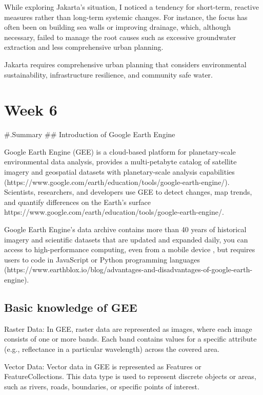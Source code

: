 \documentclass[
  letterpaper,
  DIV=11,
  numbers=noendperiod]{scrreprt}
\begin{document}
While exploring Jakarta's situation, I noticed a tendency for
short-term, reactive measures rather than long-term systemic changes.
For instance, the focus has often been on building sea walls or
improving drainage, which, although necessary, failed to manage the root
causes such as excessive groundwater extraction and less comprehensive
urban planning.

Jakarta requires comprehensive urban planning that considers
environmental sustainability, infrastructure resilience, and community
safe water.


\chapter{Week 6}\label{week-6}

\#.Summary \#\# Introduction of Google Earth Engine

Google Earth Engine (GEE) is a cloud-based platform for planetary-scale
environmental data analysis, provides a multi-petabyte catalog of
satellite imagery and geospatial datasets with planetary-scale analysis
capabilities
(https://www.google.com/earth/education/tools/google-earth-engine/).
Scientists, researchers, and developers use GEE to detect changes, map
trends, and quantify differences on the Earth's surface
https://www.google.com/earth/education/tools/google-earth-engine/.

Google Earth Engine's data archive contains more than 40 years of
historical imagery and scientific datasets that are updated and expanded
daily, you can access to high-performance computing, even from a mobile
device , but requires users to code in JavaScript or Python programming
languages
(https://www.earthblox.io/blog/advantages-and-disadvantages-of-google-earth-engine).

\section{Basic knowledge of GEE}\label{basic-knowledge-of-gee}

Raster Data: In GEE, raster data are represented as images, where each
image consists of one or more bands. Each band contains values for a
specific attribute (e.g., reflectance in a particular wavelength) across
the covered area.

Vector Data: Vector data in GEE is represented as Features or
FeatureCollections. This data type is used to represent discrete objects
or areas, such as rivers, roads, boundaries, or specific points of
interest.
\end{document}
